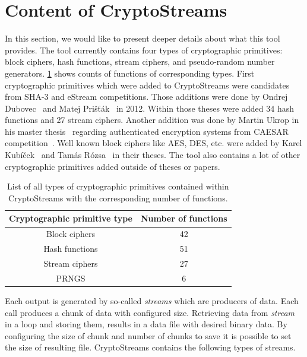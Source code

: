 \documentclass[
    digital,    %
    oneside,    %
    color,
    11pt,
    nocover,
    notable,
    nolof,
    nolot,
    final
]{fithesis3}
\renewcommand\_{\textunderscore\allowbreak}
\begin{document}
\section{Content of CryptoStreams}

In this section, we would like to present deeper details about what this tool provides. The tool currently contains four types of cryptographic primitives: block ciphers, hash functions, stream ciphers, and pseudo-random number generators. \cref{table:all-cryptoprimitives} shows counts of functions of corresponding types. First cryptographic primitives which were added to CryptoStreams were candidates from SHA-3 and eStream competitions. Those additions were done by Ondrej Dubovec~\cite{Dubovec2012thesis} and Matej Prišťák~\cite{Pristak2012thesis} in 2012. Within those theses were added 34 hash functions and 27 stream ciphers. Another addition was done by Martin Ukrop in his master thesis~\cite{Ukrop2016thesis} regarding authenticated encryption systems from CAESAR competition~\cite{caesar-competition}. Well known block ciphers like AES, DES, etc. were added by Karel Kubíček~\cite{Kubicek2017thesis} and Tamás Rózsa~\cite{Rozsa2018thesis} in their theses. The tool also contains a lot of other cryptographic primitives added outside of theses or papers.

\begin{table}[t]
	\centering	
	\begin{tabular}{|c|c|}
		\hline
		\textbf{\large Cryptographic primitive type} &  \textbf{\large Number of functions} \\ \hline
		Block ciphers  & 42 \\ \hline
		Hash functions & 51 \\ \hline  
		Stream ciphers & 27 \\ \hline
		PRNGS 		   & 6  \\ \hline		
	\end{tabular}
	\caption{List of all types of cryptographic primitives contained within CryptoStreams with the corresponding number of functions.}
	\label{table:all-cryptoprimitives}
\end{table}

Each output is generated by so-called \textit{streams} which are producers of data. Each call produces a chunk of data with configured size. Retrieving data from \textit{stream} in a loop and storing them, results in a data file with desired binary data. By configuring the size of chunk and number of chunks to save it is possible to set the size of resulting file. CryptoStreams contains the following types of streams.
\end{document}
